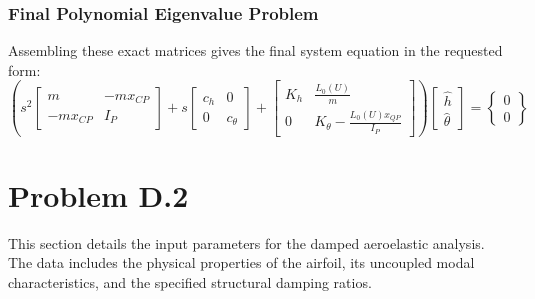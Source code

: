 \documentclass{article}
\begin{document}
\subsubsection{Final Polynomial Eigenvalue Problem}
Assembling these exact matrices gives the final system equation in the requested form:
\begin{equation}
\boxed{
\left( s^2
\begin{bmatrix} m & -mx_{CP} \\ -mx_{CP} & I_P \end{bmatrix}
+ s
\begin{bmatrix} c_h & 0 \\ 0 & c_\theta \end{bmatrix}
+
\begin{bmatrix} K_h & \frac{L_0(U)}{m} \\ 0 & K_\theta - \frac{L_0(U)x_{QP}}{I_P} \end{bmatrix}
\right)
\begin{bmatrix} \hat{h} \\ \hat{\theta} \end{bmatrix}
=
\begin{Bmatrix} 0 \\ 0 \end{Bmatrix}
}
\end{equation}


\newpage
\section{Problem D.2}
This section details the input parameters for the damped aeroelastic analysis. The data includes the physical properties of the airfoil, its uncoupled modal characteristics, and the specified structural damping ratios.
\end{document}
